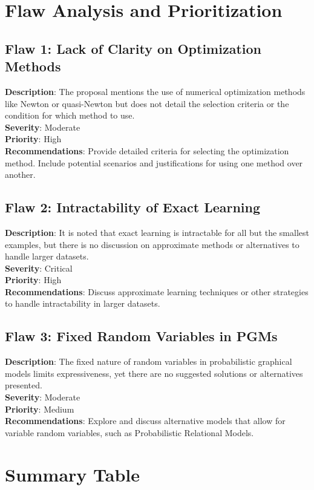 \documentclass{article}
\begin{document}
\section*{Flaw Analysis and Prioritization}

\subsection*{Flaw 1: Lack of Clarity on Optimization Methods}
\textbf{Description}: The proposal mentions the use of numerical optimization methods like Newton or quasi-Newton but does not detail the selection criteria or the condition for which method to use. \\
\textbf{Severity}: Moderate \\
\textbf{Priority}: High \\
\textbf{Recommendations}: Provide detailed criteria for selecting the optimization method. Include potential scenarios and justifications for using one method over another.

\subsection*{Flaw 2: Intractability of Exact Learning}
\textbf{Description}: It is noted that exact learning is intractable for all but the smallest examples, but there is no discussion on approximate methods or alternatives to handle larger datasets. \\
\textbf{Severity}: Critical \\
\textbf{Priority}: High \\
\textbf{Recommendations}: Discuss approximate learning techniques or other strategies to handle intractability in larger datasets.

\subsection*{Flaw 3: Fixed Random Variables in PGMs}
\textbf{Description}: The fixed nature of random variables in probabilistic graphical models limits expressiveness, yet there are no suggested solutions or alternatives presented. \\
\textbf{Severity}: Moderate \\
\textbf{Priority}: Medium \\
\textbf{Recommendations}: Explore and discuss alternative models that allow for variable random variables, such as Probabilistic Relational Models.

\section*{Summary Table}
\end{document}
